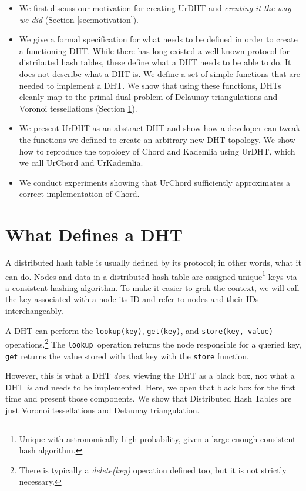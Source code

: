 \documentclass[11pt,conference]{IEEEtran}
\begin{document}
\begin{itemize}
	\item We first discuss our motivation for creating UrDHT and \textit{creating it the way we did}  (Section \ref{sec:motivation}).
	\item We give a formal specification for what needs to be defined in order to create a functioning DHT.
	While there has long existed a well known protocol for distributed hash tables, these define what a DHT needs to be able to do.
	It does not describe what a DHT is.
	We define a set of simple functions that are needed to implement a DHT.
	We show that using these functions, DHTs cleanly map to the primal-dual problem of Delaunay triangulations and Voronoi tessellations (Section \ref{sec:define}).
	\item We present UrDHT as an abstract DHT and show how a developer can tweak the functions we defined to create an arbitrary new DHT topology.
	We show how to reproduce the topology of Chord and Kademlia using UrDHT, which we call UrChord and UrKademlia.
	\item We conduct experiments showing that UrChord sufficiently approximates a correct implementation of Chord.
\end{itemize}


\section{What Defines a DHT}
\label{sec:define}

A distributed hash table is usually defined by its protocol; in other words, what it can do.
Nodes and data in a distributed hash table are assigned unique\footnote{Unique with astronomically high probability, given a large enough consistent hash algorithm.} keys via a consistent hashing algorithm.
To make it easier to grok the context, we will call the key associated with a node its ID and refer to  nodes and their IDs interchangeably.

A DHT can perform the \texttt{lookup(key)}, \texttt{get(key)}, and \texttt{store(key, value)} operations.\footnote{There is typically a \textit{delete(key)} operation defined too, but it is not strictly necessary.}
The \texttt{lookup }operation returns the node responsible for a queried key, \texttt{get} returns the value stored with that key with the \texttt{store} function.

However, this is what a DHT \textit{does}, viewing the DHT as a black box, not what a DHT \textit{is} and needs to be implemented.
Here, we open that black box for the first time and present those components.
We show that Distributed Hash Tables are just Voronoi tessellations and Delaunay triangulation.
\end{document}
